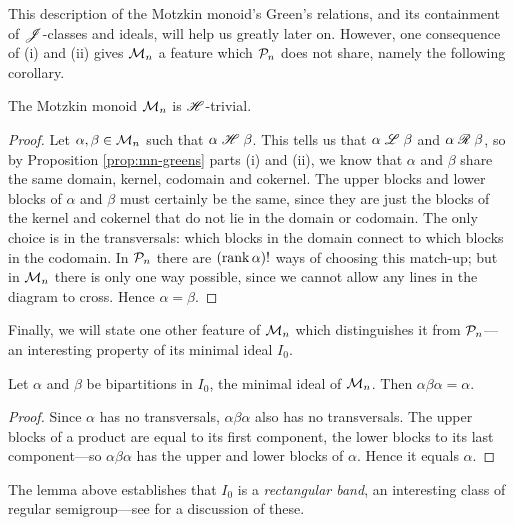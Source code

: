 This description of the Motzkin monoid's Green's relations, and its containment
of $\mathrel{\mathscr{J}}$-classes and ideals, will help us greatly later on.  However, one
consequence of (i) and (ii) gives $\mathcal{M}_n$ a feature which $\mathcal{P}_n$ does not
share, namely the following corollary.

\begin{corollary}
  \label{cor:mn-h-trivial}
  The Motzkin monoid $\mathcal{M}_n$ is $\mathrel{\mathscr{H}}$-trivial.
  \begin{proof}
    Let $\alpha, \beta \in \mathcal{M}_n$ such that $\alpha \mathrel{\mathscr{H}} \beta$.  This tells us
    that $\alpha \mathrel{\mathscr{L}} \beta$ and $\alpha \mathrel{\mathscr{R}} \beta$, so by Proposition
    \ref{prop:mn-greens} parts (i) and (ii), we know that $\alpha$ and $\beta$
    share the same domain, kernel, codomain and cokernel.  The upper blocks and
    lower blocks of $\alpha$ and $\beta$ must certainly be the same, since they
    are just the blocks of the kernel and cokernel that do not lie in the domain
    or codomain.  The only choice is in the transversals: which blocks in the
    domain connect to which blocks in the codomain.  In $\mathcal{P}_n$ there are
    $(\operatorname{rank} \alpha)!$ ways of choosing this match-up; but in $\mathcal{M}_n$ there is
    only one way possible, since we cannot allow any lines in the diagram to
    cross.  Hence $\alpha = \beta$.
  \end{proof}
\end{corollary}

Finally, we will state one other feature of $\mathcal{M}_n$ which distinguishes it from
$\mathcal{P}_n$---an interesting property of its minimal ideal $I_0$.

\begin{lemma}
  \label{lem:i0-rect-band}
  Let $\alpha$ and $\beta$ be bipartitions in $I_0$, the minimal ideal of
  $\mathcal{M}_n$.  Then $\alpha \beta \alpha = \alpha$.
  \begin{proof}
    Since $\alpha$ has no transversals, $\alpha\beta\alpha$ also has no
    transversals.  The upper blocks of a product are equal to its first
    component, the lower blocks to its last component---so $\alpha\beta\alpha$
    has the upper and lower blocks of $\alpha$.  Hence it equals $\alpha$.
  \end{proof}
\end{lemma}

The lemma above establishes that $I_0$ is a \textit{rectangular band}, an
interesting class of regular semigroup---see \cite[\S4.4]{howie} for a
discussion of these. 

